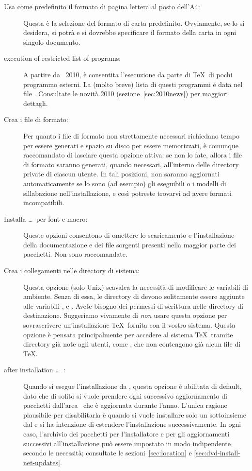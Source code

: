 \documentclass{article}
\begin{document}
\begin{description}
\item[Usa come predefinito il formato di pagina lettera al posto dell'A4:]
  Questa è la selezione del formato di carta predefinito. Ovviamente, se
  lo si desidera, si potrà e si dovrebbe specificare il formato della
  carta in ogni singolo documento.

\item[execution of restricted list of programs:] A partire da \TL\ 2010,
  è consentita l'esecuzione da parte di \TeX\ di pochi programmo esterni.
  La (molto breve) lista di questi programmi è data nel file
  . Consultate le novità 2010
  (sezione~\ref{sec:2010news}) per maggiori dettagli.

\item[Crea i file di formato:] Per quanto i file di formato non
  strettamente necessari richiedano tempo per essere generati e spazio su
  disco per essere memorizzati, è comunque raccomandato di lasciare questa
  opzione attiva: se non lo fate, allora i file di formato saranno
  generati, quando necessari, all'interno delle directory private
   di ciascun utente. In tali posizioni, non saranno
  aggiornati automaticamente se lo sono (ad esempio) gli eseguibili o i
  modelli di sillabazione nell'installazione, e così potreste trovarvi ad
  avere formati incompatibili.

\item[Installa \ldots\ per font e macro:] Queste opzioni consentono di
  omettere lo scaricamento e l'installazione della documentazione e dei
  file sorgenti presenti nella maggior parte dei pacchetti. Non sono
  raccomandate.

\item[Crea i collegamenti nelle directory di sistema:] Questa opzione
  (solo Unix) scavalca la necessità di modificare le variabili di ambiente.
  Senza di essa, le directory di \TL{} devono solitamente essere aggiunte
  alle variabili ,  e .
  Avete bisogno dei permessi di scrittura nelle directory di destinazione.
  Suggeriamo vivamente di \emph{non} usare questa opzione per
  sovrascrivere un'installazione \TeX\ fornita con il vostro sistema.
  Questa opzione è pensata principalmente per accedere al sistema \TeX\
  tramite directory già note agli utenti, come ,
  che non contengono già alcun file di \TeX.

\item[after installation \ldots\ \CTAN:] Quando si esegue l'installazione
  da \DVD, questa opzione è abilitata di default, dato che di solito si
  vuole prendere ogni successivo aggiornamento di pacchetti dall'area
  \CTAN\ che è aggiornata durante l'anno. L'unica ragione plausibile per
  disabilitarla è quando si vuole installare solo un sottoinsieme dal \DVD
  e si ha intenzione di estendere l'installazione successivamente. In
  ogni caso, l'archivio dei pacchetti per l'installatore e per gli
  aggiornamenti successivi all'installazione può essere impostato in modo
  indipendente secondo le necessità; consultate le sezioni~\ref{sec:location}
  e \ref{sec:dvd-install-net-updates}.
\end{description}
\end{document}
